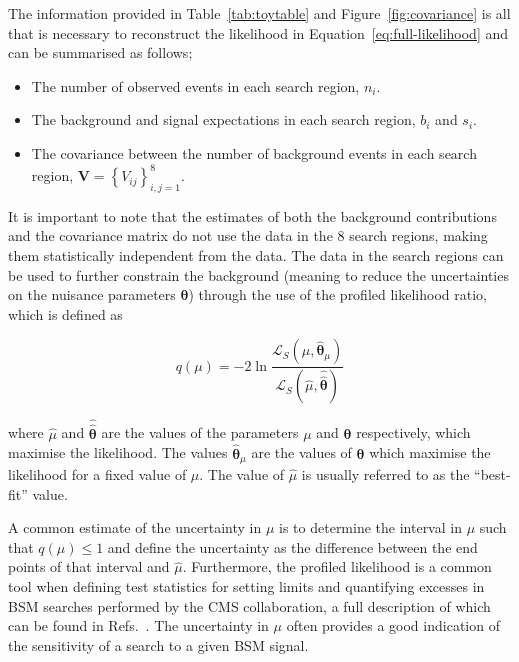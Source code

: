 The information provided in Table~\ref{tab:toytable} and Figure~\ref{fig:covariance} is all that is necessary to reconstruct the likelihood in Equation~\ref{eq:full-likelihood} and 
can be summarised as follows; 

\begin{itemize}
\item {The number of observed events in each search region, $n_{i}$.}
\item {The background and signal expectations in each search region, $b_{i}$ and $s_{i}$.}
\item {The covariance between the number of background events in each search region, $\mathrm{\mathbf{V}}=\left\{V_{ij}\right\}_{i,j=1}^{8}$. }
\end{itemize}

It is important to note that the estimates of both the background contributions and the 
covariance matrix do not use the data in the 8 search regions, making them statistically independent from the data. The data in the search regions 
can be used to further constrain the background (meaning to reduce the uncertainties on the nuisance parameters $\boldsymbol{\theta}$) through the use 
of the profiled likelihood ratio, which is defined as 

\begin{equation}
q(\mu) = -2\ln \dfrac {\mathcal{L}_{S}(\mu,\hat{\boldsymbol{\theta}}_{\mu})} {\mathcal{L}_{S}(\hat{\mu},\hat{\hat{\boldsymbol{\theta}}})}
\label{eq:llr}
\end{equation}

where $\hat{\mu}$ and $\hat{\hat{\boldsymbol{\theta}}}$ are the values of the parameters $\mu$ and $\boldsymbol{\theta}$ respectively, 
which maximise the likelihood. The values $\hat{\boldsymbol{\theta}}_{\mu}$ are the values of $\boldsymbol{\theta}$ which maximise the 
likelihood for a fixed value of $\mu$. The value of $\hat{\mu}$ is usually referred to as the ``best-fit'' value.

A common estimate of the uncertainty in $\mu$ is to determine the interval in $\mu$ such that $q(\mu)\leq1$ and define the uncertainty as the difference between 
the end points of that interval and $\hat{\mu}$. Furthermore, the profiled likelihood is a common tool when defining test statistics for setting limits and quantifying excesses 
in BSM searches performed by the CMS collaboration, a full description of which can be found in Refs.~\cite{Chatrchyan:2012tx}. The 
uncertainty in $\mu$ often provides a good indication of the sensitivity of a search to a given BSM signal. 

